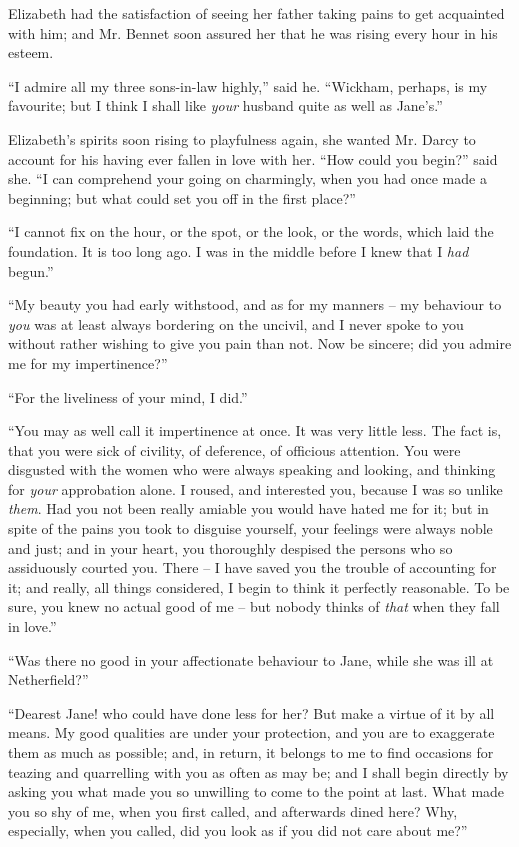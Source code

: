 Elizabeth had the satisfaction of seeing her father
taking pains to get acquainted with him; and Mr. Bennet
soon assured her that he was rising every hour in his
esteem.

“I admire all my three sons-in-law highly,” said he.
“Wickham, perhaps, is my favourite; but I think I shall
like \textit{your} husband quite as well as Jane’s.”


Elizabeth’s spirits soon rising to playfulness again, she
want\-ed Mr. Darcy to account for his having ever fallen
in love with her. “How could you begin?” said she.
“I can comprehend your going on charmingly, when you
had once made a beginning; but what could set you off
in the first place?”

“I cannot fix on the hour, or the spot, or the look, or
the words, which laid the foundation. It is too long ago.
I was in the middle before I knew that I \textit{had} begun.”

“My beauty you had early withstood, and as for my
manners -- my behaviour to \textit{you} was at least always
bordering on the uncivil, and I never spoke to you without
rather wishing to give you pain than not. Now be
sincere; did you admire me for my impertinence?”

“For the liveliness of your mind, I did.”

“You may as well call it impertinence at once. It was
very little less. The fact is, that you were sick of civility,
of deference, of officious attention. You were disgusted
with the women who were always speaking and looking,
and thinking for \textit{your} approbation alone. I roused, and
interested you, because I was so unlike \textit{them}. Had you
not been really amiable you would have hated me for it;
but in spite of the pains you took to disguise yourself,
your feelings were always noble and just; and in your
heart, you thoroughly despised the persons who so assiduously
courted you. There -- I have saved you the trouble
of accounting for it; and really, all things considered,
I begin to think it perfectly reasonable. To be sure, you
knew no actual good of me -- but nobody thinks of \textit{that}
when they fall in love.”

“Was there no good in your affectionate behaviour to
Jane, while she was ill at Netherfield?”

“Dearest Jane! who could have done less for her?
But make a virtue of it by all means. My good qualities
are under your protection, and you are to exaggerate them
as much as possible; and, in return, it belongs to me to
find occasions for teazing and quarrelling with you as often
as may be; and I shall begin directly by asking you what
made you so unwilling to come to the point at last. What
made you so shy of me, when you first called, and afterwards
dined here? Why, especially, when you called, did
you look as if you did not care about me?”

